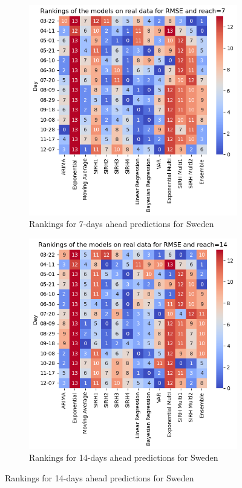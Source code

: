  


\begin{figure}[h!]
    \centering
    \begin{subfigure}[b]{0.45\textwidth}
      \centering
      \includegraphics[width=\textwidth]{figures/heatmap_test_sweden_7.png}  
      \caption{Rankings for 7-days ahead predictions for Sweden }
      \label{fig:sousfig1}
    \end{subfigure}
    \hfill
    \begin{subfigure}[b]{0.45\textwidth}
      \centering
      \includegraphics[width=\textwidth]{figures/heatmap_test_sweden_14.png}  
      \caption{Rankings for 14-days ahead predictions for Sweden }
      \label{fig:sousfig2}
    \end{subfigure}
    

\end{figure}
